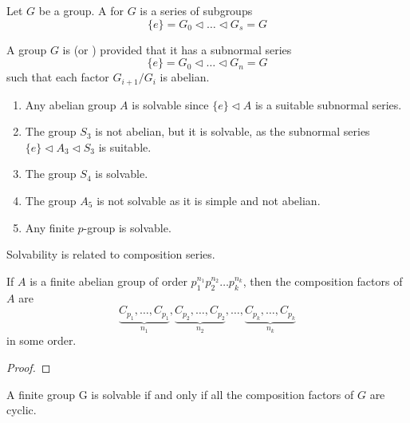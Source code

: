 \begin{definition}
  Let \(G\) be a group. A  for \(G\) is a series of subgroups
  \[\{e\} = G_{0} \triangleleft \ldots \triangleleft G_{s} = G\]
\end{definition}

\begin{definition}
  A group \(G\) is  (or ) provided that it has a subnormal series
  \[\{e\} = G_{0} \triangleleft \ldots \triangleleft G_{n} = G\]
  such that each factor \(G_{i+1} / G_{i}\) is abelian.
\end{definition}

\begin{example}
  \begin{enumerate}
  \item Any abelian group \(A\) is solvable since \(\{e\} \triangleleft A\) is a suitable subnormal series.

  \item The group \(S_{3}\) is not abelian, but it is solvable, as the subnormal series \(\{e\} \triangleleft A_{3} \triangleleft S_{3}\) is suitable.

  \item The group \(S_{4}\) is solvable.

  \item The group \(A_{5}\) is not solvable as it is simple and not abelian.

  \item Any finite \(p\)-group is solvable.
  \end{enumerate}
\end{example}

Solvability is related to composition series.

\begin{lemma}\label{lem:group-theory:composition-factors-are-cyclic}
  If \(A\) is a finite abelian group of order \(p_{1}^{n_{1}} p_{2}^{n_{2}} \ldots p_{k}^{n_{k}}\), then the composition factors of \(A\) are
  \[\underbrace{C_{p_{1}}, \ldots, C_{p_{1}}}_{n_{1}} , \underbrace{C_{p_{2}}, \ldots, C_{p_{2}}}_{n_{2}} , \ldots , \underbrace{C_{p_{k}}, \ldots, C_{p_{k}}}_{n_{k}}\]
  in some order.
\end{lemma}

\begin{proof}
\end{proof}

\begin{theorem}
  A finite group G is solvable if and only if all the composition factors of \(G\) are cyclic.
\end{theorem}

